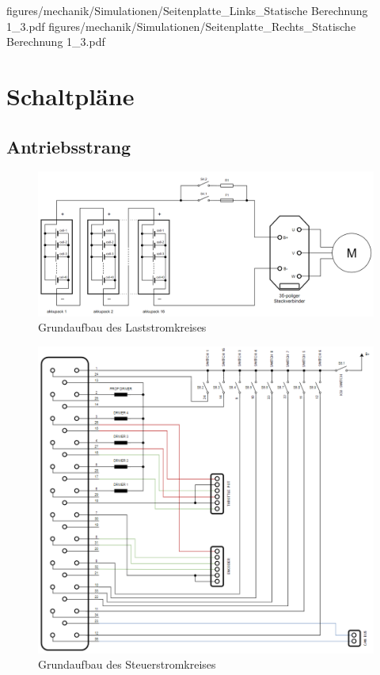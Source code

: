  {figures/mechanik/Simulationen/Seitenplatte_Links_Statische Berechnung 1_3.pdf}
 {figures/mechanik/Simulationen/Seitenplatte_Rechts_Statische Berechnung 1_3.pdf}

\newpage

\chapter{Schaltpläne}

\section{Antriebsstrang}
\begin{figure}[H]
	\begin{center}
		\includegraphics[scale=0.35]{figures/Antrieb/Antrieb_Laststromkreis.png}
		\caption{Grundaufbau des Laststromkreises}
		\label{Grundaufbau_Laststromkreis}
	\end{center}
\end{figure}

\begin{figure}[H]
	\begin{center}
		\includegraphics[scale=0.67]{figures/Antrieb/Antrieb_Steuerstromkreis.png}
		\caption{Grundaufbau des Steuerstromkreises}
		\label{Grundaufbau_Steuerstromkreis}
	\end{center}
\end{figure}

